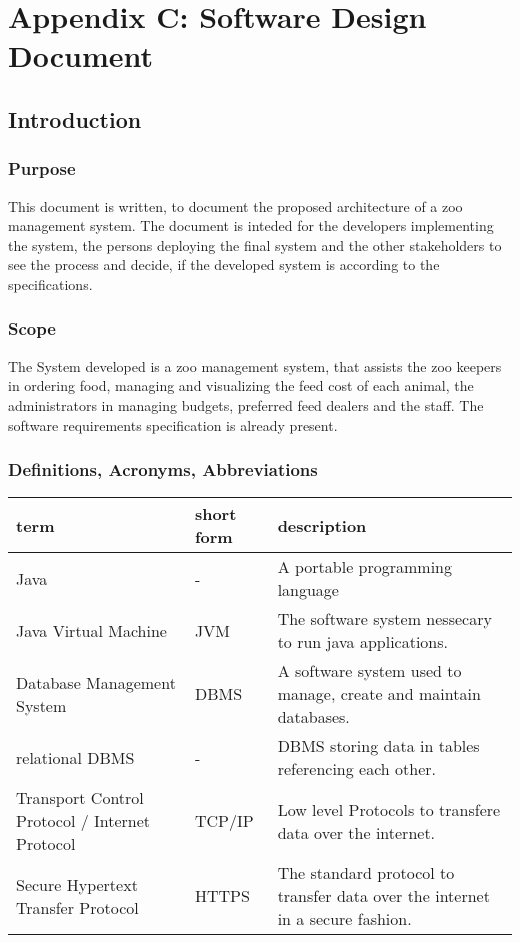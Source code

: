 \section{Appendix C: Software Design Document}

	\subsection{Introduction}
		\subsubsection{Purpose}
			This document is written, to document the proposed architecture of a zoo management system. The document is inteded for the developers implementing the system, the persons deploying the final system and the other stakeholders to see the process and decide, if the developed system is according to the specifications.
		\subsubsection{Scope}
			The System developed is a zoo management system, that assists the zoo keepers in ordering food, managing and visualizing the feed cost of each animal, the administrators in managing budgets, preferred feed dealers and the staff. The software requirements specification is already present.
		\subsubsection{Definitions, Acronyms, Abbreviations}
			\begin{tabular}{|p{}|p{}|p{}|}
				\hline
			\textbf{term}&\textbf{short form}&\textbf{description}\\
				\hline
				Java&-&A portable programming language\\
				\hline
				Java Virtual Machine&JVM&The software system nessecary to run java applications.\\
				\hline
				Database Management System&DBMS&A software system used to manage, create and maintain databases.\\
				\hline
				relational DBMS&-&DBMS storing data in tables referencing each other.\\
				\hline
				Transport Control Protocol / Internet Protocol&TCP/IP&Low level Protocols to transfere data over the internet.\\
				\hline
				Secure Hypertext Transfer Protocol&HTTPS&The standard protocol to transfer data over the internet in a secure fashion.\\
				\hline

			\end{tabular}
